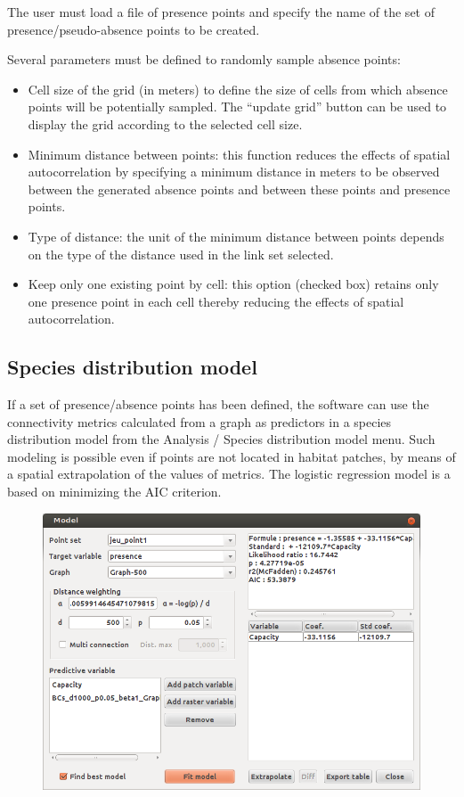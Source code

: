 \documentclass{article}
\begin{document}
The user must load a file of presence points and specify the name of the set of presence/pseudo-absence points to be created.

Several parameters must be defined to randomly sample absence points:
\begin{itemize}
	\item Cell size of the grid (in meters) to define the size of cells from which absence points will be potentially sampled. The “update grid” button can be used to display the grid according to the selected cell size. 
	\item Minimum distance between points: this function reduces the effects of spatial autocorrelation by specifying a minimum distance in meters to be observed between the generated absence points and between these points and presence points.
	\item Type of distance: the unit of the minimum distance between points depends on the type of the distance used in the link set selected.
	\item Keep only one existing point by cell: this option (checked box) retains only one presence point in each cell thereby reducing the effects of spatial autocorrelation.
\end{itemize}

\subsection{Species distribution model}
\label{sdm}
If a set of presence/absence points has been defined, the software can use the connectivity metrics calculated from a graph as predictors in a species distribution model from the Analysis / Species distribution model menu. Such modeling is possible even if points are not located in habitat patches, by means of a spatial extrapolation of the values of metrics. The logistic regression model is a based on minimizing the AIC
criterion.

\begin{figure}[H]
	\includegraphics[scale=0.5]{img/manual-en_img14.png}
\end{figure}
\end{document}
